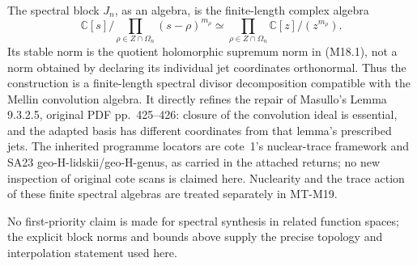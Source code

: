 The spectral block \(J_n\), as an algebra, is the
finite-length complex algebra
\[
 \mathbb C[s]\Big/
       \prod_{\rho\in Z\cap\Omega_n}(s-\rho)^{m_\rho}
 \simeq
 \prod_{\rho\in Z\cap\Omega_n}
                  \mathbb C[z]/(z^{m_\rho}).
\]
Its stable norm is the quotient holomorphic supremum
norm in (M18.1), not a norm obtained by declaring its
individual jet coordinates orthonormal.
Thus the construction is a finite-length spectral
divisor decomposition compatible with the Mellin
convolution algebra.  It directly refines the repair
of Masullo's Lemma 9.3.2.5, original PDF pp.~425--426:
closure of the convolution ideal is essential, and
the adapted basis has different coordinates from
that lemma's prescribed jets.  The inherited programme
locators are cote~1's nuclear-trace framework and
SA23 geo-H-lidskii/geo-H-genus, as carried in the
attached returns; no new inspection of original
cote scans is claimed here.  Nuclearity and the
trace action of these finite spectral algebras
are treated separately in MT-M19.

No first-priority claim is made for spectral synthesis in related
function spaces; the explicit block norms and bounds above supply
the precise topology and interpolation statement used here.

